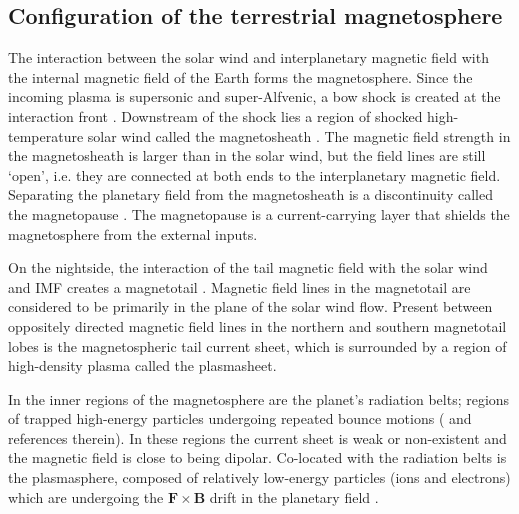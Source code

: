 \subsection{Configuration of the terrestrial magnetosphere}
The interaction between the solar wind and interplanetary magnetic field with the internal magnetic field of the Earth forms the magnetosphere. Since the incoming plasma is supersonic and super-Alfvenic, a bow shock is created at the interaction front \cite{Spreiter1966HydromagneticMagnetosphere}. Downstream of the shock lies a region of shocked high-temperature solar wind called the magnetosheath \cite{Lucek2005TheMagnetosheath}. The magnetic field strength in the magnetosheath is larger than in the solar wind, but the field lines are still `open', i.e. they are connected at both ends to the interplanetary magnetic field. Separating the planetary field from the magnetosheath is a discontinuity called the magnetopause \cite{Russell1978InitialObservations,Sonnerup1967MagnetopauseObservations}. The magnetopause is a current-carrying layer that shields the magnetosphere from the external inputs.

On the nightside, the interaction of the tail magnetic field with the solar wind and IMF creates a magnetotail \cite{Hones1984StructureActivity}. Magnetic field lines in the magnetotail are considered to be primarily in the plane of the solar wind flow. Present between oppositely directed magnetic field lines in the northern and southern magnetotail lobes is the magnetospheric tail current sheet, which is surrounded by a region of high-density plasma called the plasmasheet. 

In the inner regions of the magnetosphere are the planet's radiation belts; regions of trapped high-energy particles undergoing repeated bounce motions ( and references therein). In these regions the current sheet is weak or non-existent and the magnetic field is close to being dipolar. Co-located with the radiation belts is the plasmasphere, composed of relatively low-energy particles (ions and electrons) which are undergoing the $\mathbf{F}\times\mathbf{B}$ drift in the planetary field \cite{Lemaire1998ThePlasmasphere}.

